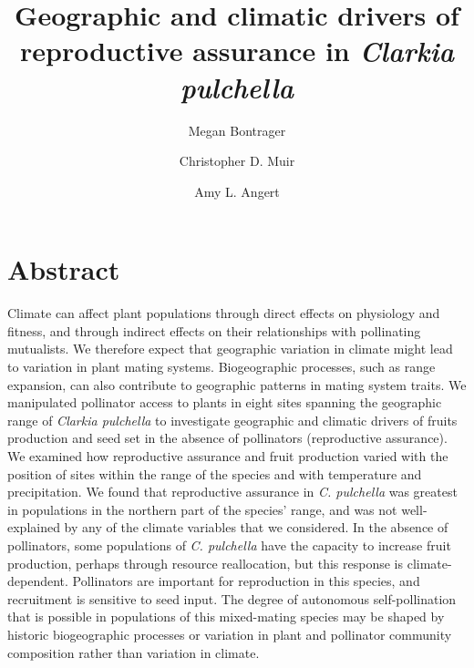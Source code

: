 \documentclass{article}
\begin{document}
\title{Geographic and climatic drivers of reproductive assurance in \textit{Clarkia pulchella}}
\author[1,4]{Megan Bontrager}
\author[2]{Christopher D. Muir}
\author[3]{Amy L. Angert}
\date{}
\maketitle



\newpage

\linenumbers

\section*{Abstract}

Climate can affect plant populations through direct effects on physiology and fitness, and through indirect effects on their relationships with pollinating mutualists. We therefore expect that geographic variation in climate might lead to variation in plant mating systems. Biogeographic processes, such as range expansion, can also contribute to geographic patterns in mating system traits. We manipulated pollinator access to plants in eight sites spanning the geographic range of \textit{Clarkia pulchella} to investigate geographic and climatic drivers of fruits production and seed set in the absence of pollinators (reproductive assurance). We examined how reproductive assurance and fruit production varied with the position of sites within the range of the species and with temperature and precipitation. We found that reproductive assurance in \textit{C. pulchella} was greatest in populations in the northern part of the species' range, and was not well-explained by any of the climate variables that we considered. In the absence of pollinators, some populations of \textit{C. pulchella} have the capacity to increase fruit production, perhaps through resource reallocation, but this response is climate-dependent. Pollinators are important for reproduction in this species, and recruitment is sensitive to seed input. The degree of autonomous self-pollination that is possible in populations of this mixed-mating species may be shaped by historic biogeographic processes or variation in plant and pollinator community composition rather than variation in climate.
\end{document}
